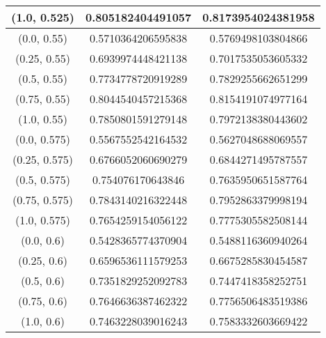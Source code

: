 \begin{table}[H]
\begin{tabular}{|c|c|c|}
\hline
(1.0, 0.525) & 0.805182404491057 & 0.8173954024381958 \\
\hline
\hline
(0.0, 0.55) & 0.5710364206595838 & 0.5769498103804866 \\
\hline
(0.25, 0.55) & 0.6939974448421138 & 0.7017535053605332 \\
\hline
(0.5, 0.55) & 0.7734778720919289 & 0.7829255662651299 \\
\hline
(0.75, 0.55) & 0.8044540457215368 & 0.8154191074977164 \\
\hline
(1.0, 0.55) & 0.7850801591279148 & 0.7972138380443602 \\
\hline
\hline
(0.0, 0.575) & 0.5567552542164532 & 0.5627048688069557 \\
\hline
(0.25, 0.575) & 0.6766052060690279 & 0.6844271495787557 \\
\hline
(0.5, 0.575) & 0.754076170643846 & 0.7635950651587764 \\
\hline
(0.75, 0.575) & 0.7843140216322448 & 0.7952863379998194 \\
\hline
(1.0, 0.575) & 0.7654259154056122 & 0.7775305582508144 \\
\hline
\hline
(0.0, 0.6) & 0.5428365774370904 & 0.5488116360940264 \\
\hline
(0.25, 0.6) & 0.6596536111579253 & 0.6675285830454587 \\
\hline
(0.5, 0.6) & 0.7351829252092783 & 0.7447418358252751 \\
\hline
(0.75, 0.6) & 0.7646636387462322 & 0.7756506483519386 \\
\hline
(1.0, 0.6) & 0.7463228039016243 & 0.7583332603669422 \\
\hline
\end{tabular}
\end{table}
